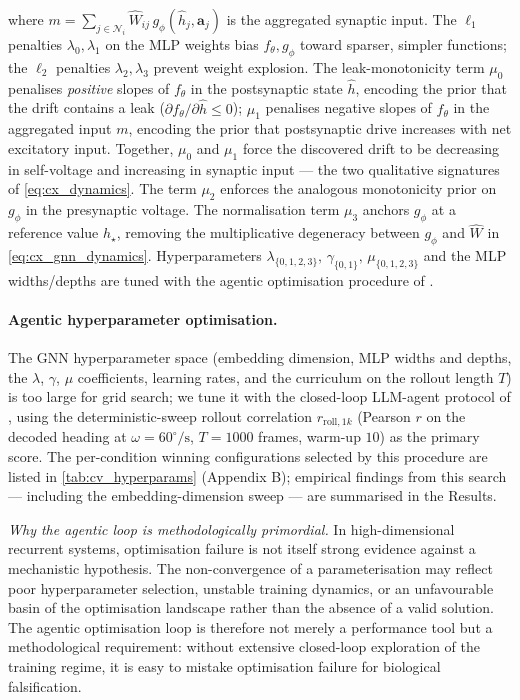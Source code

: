 \documentclass[11pt]{article}
\begin{document}
where $m = \sum_{j\in\mathcal{N}_i}\hat{W}_{ij}\,g_\phi(\hat{h}_j,\mathbf{a}_j)$ is the aggregated synaptic input. The $\ell_1$ penalties $\lambda_0,\lambda_1$ on the MLP weights bias $f_\theta,g_\phi$ toward sparser, simpler functions; the $\ell_2$ penalties $\lambda_2,\lambda_3$ prevent weight explosion. The leak-monotonicity term $\mu_0$ penalises \emph{positive} slopes of $f_\theta$ in the postsynaptic state $\hat{h}$, encoding the prior that the drift contains a leak ($\partial f_\theta/\partial \hat{h} \le 0$); $\mu_1$ penalises negative slopes of $f_\theta$ in the aggregated input $m$, encoding the prior that postsynaptic drive increases with net excitatory input. Together, $\mu_0$ and $\mu_1$ force the discovered drift to be decreasing in self-voltage and increasing in synaptic input --- the two qualitative signatures of \cref{eq:cx_dynamics}. The term $\mu_2$ enforces the analogous monotonicity prior on $g_\phi$ in the presynaptic voltage. The normalisation term $\mu_3$ anchors $g_\phi$ at a reference value $h_\star$, removing the multiplicative degeneracy between $g_\phi$ and $\hat{W}$ in \cref{eq:cx_gnn_dynamics}. Hyperparameters $\lambda_{\{0,1,2,3\}},\,\gamma_{\{0,1\}},\,\mu_{\{0,1,2,3\}}$ and the MLP widths/depths are tuned with the agentic optimisation procedure of \citep{allier_connectome_2026}.

\paragraph{Agentic hyperparameter optimisation.}\label{para:agent_gnn}
The GNN hyperparameter space (embedding dimension, MLP widths and depths, the $\lambda$, $\gamma$, $\mu$ coefficients, learning rates, and the curriculum on the rollout length $T$) is too large for grid search; we tune it with the closed-loop LLM-agent protocol of \citep{allier_connectome_2026}, using the deterministic-sweep rollout correlation $r_{\mathrm{roll},1k}$ (Pearson $r$ on the decoded heading at $\omega = 60^\circ/\mathrm{s}$, $T = 1000$ frames, warm-up $10$) as the primary score. The per-condition winning configurations selected by this procedure are listed in \cref{tab:cv_hyperparams} (Appendix B); empirical findings from this search --- including the embedding-dimension sweep --- are summarised in the Results.

\medskip
\noindent\emph{Why the agentic loop is methodologically primordial.} In high-dimensional recurrent systems, optimisation failure is not itself strong evidence against a mechanistic hypothesis. The non-convergence of a parameterisation may reflect poor hyperparameter selection, unstable training dynamics, or an unfavourable basin of the optimisation landscape rather than the absence of a valid solution. The agentic optimisation loop is therefore not merely a performance tool but a methodological requirement: without extensive closed-loop exploration of the training regime, it is easy to mistake optimisation failure for biological falsification.
\end{document}
